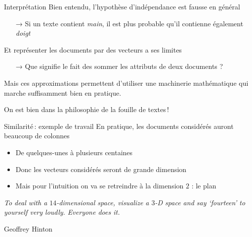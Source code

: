 \documentclass[hyperref={unicode}, xcolor={svgnames}, french]{beamer}
\begin{document}
\begin{frame}{Interprétation}
    Bien entendu, l'hypothèse d'indépendance est fausse en général
    \begin{itemize}
        \item[→] Si un texte contient \emph{main}, il est plus probable qu'il contienne également \emph{doigt}
    \end{itemize}
    Et représenter les documents par des vecteurs a ses limites
    \begin{itemize}
        \item[→] Que signifie le fait des sommer les attributs de deux documents ?
    \end{itemize}
    Mais ces approximations permettent d'utiliser une machinerie mathématique qui marche suffisamment bien en pratique.

    On est bien dans la philosophie de la fouille de textes !
\end{frame}

\begin{frame}{Similarité : exemple de travail}
    En pratique, les documents considérés auront beaucoup de colonnes
    \begin{itemize}
        \item De quelques-unes à plusieurs centaines
        \item Donc les vecteurs considérés seront de grande dimension
        \item Mais pour l'intuition on va se retreindre à la dimension $2$ : le plan
    \end{itemize}
\end{frame}

\begin{frame}[standout]
    \textit{To deal with a $14$-dimensional space, visualize a $3$-D space and say `fourteen' to yourself very loudly. Everyone does it.}

    Geoffrey Hinton
\end{frame}
\end{document}
